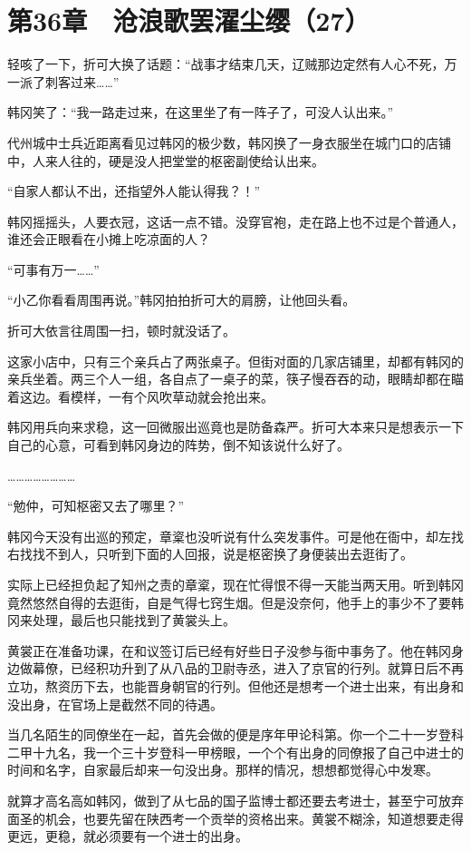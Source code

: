 \section{第36章　沧浪歌罢濯尘缨（27）}

轻咳了一下，折可大换了话题：“战事才结束几天，辽贼那边定然有人心不死，万一派了刺客过来……”

韩冈笑了：“我一路走过来，在这里坐了有一阵子了，可没人认出来。”

代州城中士兵近距离看见过韩冈的极少数，韩冈换了一身衣服坐在城门口的店铺中，人来人往的，硬是没人把堂堂的枢密副使给认出来。

“自家人都认不出，还指望外人能认得我？！”

韩冈摇摇头，人要衣冠，这话一点不错。没穿官袍，走在路上也不过是个普通人，谁还会正眼看在小摊上吃凉面的人？

“可事有万一……”

“小乙你看看周围再说。”韩冈拍拍折可大的肩膀，让他回头看。

折可大依言往周围一扫，顿时就没话了。

这家小店中，只有三个亲兵占了两张桌子。但街对面的几家店铺里，却都有韩冈的亲兵坐着。两三个人一组，各自点了一桌子的菜，筷子慢吞吞的动，眼睛却都在瞄着这边。看模样，一有个风吹草动就会抢出来。

韩冈用兵向来求稳，这一回微服出巡竟也是防备森严。折可大本来只是想表示一下自己的心意，可看到韩冈身边的阵势，倒不知该说什么好了。

……………………

“勉仲，可知枢密又去了哪里？”

韩冈今天没有出巡的预定，章楶也没听说有什么突发事件。可是他在衙中，却左找右找找不到人，只听到下面的人回报，说是枢密换了身便装出去逛街了。

实际上已经担负起了知州之责的章楶，现在忙得恨不得一天能当两天用。听到韩冈竟然悠然自得的去逛街，自是气得七窍生烟。但是没奈何，他手上的事少不了要韩冈来处理，最后也只能找到了黄裳头上。

黄裳正在准备功课，在和议签订后已经有好些日子没参与衙中事务了。他在韩冈身边做幕僚，已经积功升到了从八品的卫尉寺丞，进入了京官的行列。就算日后不再立功，熬资历下去，也能晋身朝官的行列。但他还是想考一个进士出来，有出身和没出身，在官场上是截然不同的待遇。

当几名陌生的同僚坐在一起，首先会做的便是序年甲论科第。你一个二十一岁登科二甲十九名，我一个三十岁登科一甲榜眼，一个个有出身的同僚报了自己中进士的时间和名字，自家最后却来一句没出身。那样的情况，想想都觉得心中发寒。

就算才高名高如韩冈，做到了从七品的国子监博士都还要去考进士，甚至宁可放弃面圣的机会，也要先留在陕西考一个贡举的资格出来。黄裳不糊涂，知道想要走得更远，更稳，就必须要有一个进士的出身。

